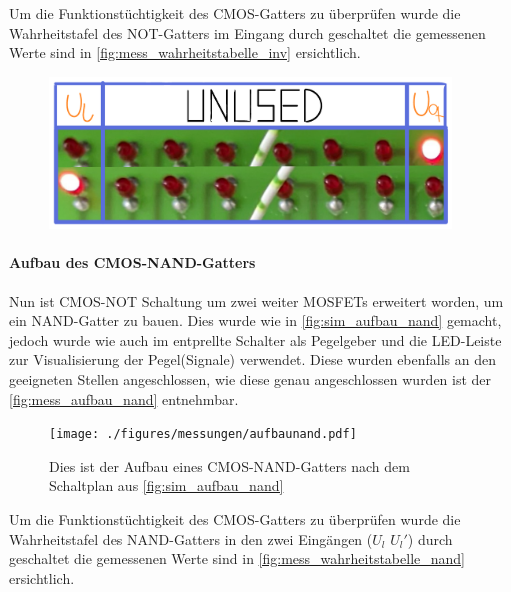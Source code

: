 \documentclass[12pt,english,ngerman]{scrartcl}
\begin{document}
Um die Funktionstüchtigkeit des CMOS-Gatters zu überprüfen wurde die
Wahrheitstafel des NOT-Gatters im Eingang durch geschaltet die gemessenen Werte
sind in \autoref{fig:mess_wahrheitstabelle_inv} ersichtlich.

\begin{figure}[H]
  \centering
    \includegraphics[width=0.95\textwidth]{./figures/messungen/WahrheitstabelleInverter.pdf}
  \caption{}
  \label{fig:mess_wahrheitstabelle_inv}
\end{figure}


\paragraph{Aufbau des CMOS-NAND-Gatters}
Nun ist CMOS-NOT Schaltung um zwei weiter MOSFETs erweitert worden, um ein
NAND-Gatter zu bauen. Dies wurde wie in \autoref{fig:sim_aufbau_nand} gemacht,
jedoch wurde wie auch im  entprellte Schalter als
Pegelgeber und die LED-Leiste zur Visualisierung der Pegel(Signale) verwendet.
Diese wurden ebenfalls an den geeigneten Stellen angeschlossen, wie diese genau
angeschlossen wurden ist der \autoref{fig:mess_aufbau_nand} entnehmbar.

\begin{figure}[H]
  \centering
    \texttt{[image: ./figures/messungen/aufbaunand.pdf]}
  \caption{Dies ist der Aufbau eines CMOS-NAND-Gatters nach dem Schaltplan aus \autoref{fig:sim_aufbau_nand}}
  \label{fig:mess_aufbau_nand}
\end{figure}

Um die Funktionstüchtigkeit des CMOS-Gatters zu überprüfen wurde die
Wahrheitstafel des NAND-Gatters in den zwei Eingängen ($U_l$ $U_l'$) durch
geschaltet die gemessenen Werte sind in \autoref{fig:mess_wahrheitstabelle_nand}
ersichtlich.
\end{document}
